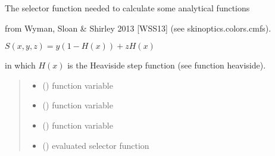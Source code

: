 \documentclass[letterpaper,10pt,english]{sphinxmanual}
\begin{document}
\begin{fulllineitems}
\label{\detokenize{01_utils:skinoptics.utils.selector_function_Wyman}}
\pysigstartsignatures
{}
\pysigstopsignatures
\begin{DUlineblock}{0em}
\item[] The selector function needed to calculate some analytical functions 
\item[] from Wyman, Sloan \& Shirley 2013 {[}WSS13{]} (see skinoptics.colors.cmfs).
\end{DUlineblock}

\sphinxAtStartPar
\(S(x,y,z) = y(1 - H(x)) + z H(x)\)

\sphinxAtStartPar
in which \(H(x)\) is the Heaviside step function (see function heaviside).
\begin{quote}\begin{description}
\begin{itemize}
\item {} 
\sphinxAtStartPar
{} () \textendash{} function variable

\item {} 
\sphinxAtStartPar
{} () \textendash{} function variable

\item {} 
\sphinxAtStartPar
{} () \textendash{} function variable

\end{itemize}

\sphinxAtStartPar
\begin{itemize}
\item {} 
\sphinxAtStartPar
{} () \textendash{} evaluated selector function

\end{itemize}


\end{description}\end{quote}

\end{fulllineitems}
\end{document}

